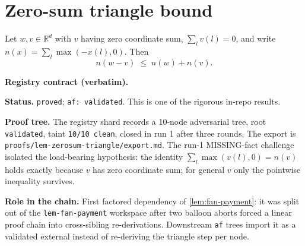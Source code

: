 \section{Zero-sum triangle bound}\label{sec:zerosum-triangle}

\begin{lemma}\label{lem:zerosum-triangle}
Let $w,v\in\mathbb{R}^d$ with $v$ having zero coordinate sum, $\sum_l v(l)=0$,
and write $n(x)=\sum_l\max(-x(l),0)$. Then
\[
  n(w-v)\;\le\;n(w)+n(v).
\]
\end{lemma}

\noindent\textbf{Registry contract (verbatim).}

\noindent\textbf{Status.} \texttt{proved}; \texttt{af: validated}.
This is one of the rigorous in-repo results.

\noindent\textbf{Proof tree.} The registry shard records a 10-node
adversarial tree, root \texttt{validated}, taint \texttt{10/10 clean},
closed in run 1 after three rounds.  The export is
\texttt{proofs/lem-zerosum-triangle/export.md}.  The run-1 MISSING-fact
challenge isolated the load-bearing hypothesis: the identity
$\sum_l \max(v(l),0) = n(v)$ holds exactly because $v$ has zero
coordinate sum; for general $v$ only the pointwise inequality survives.

\noindent\textbf{Role in the chain.} First factored dependency of
\ref{lem:fan-payment}: it was split out of the
\texttt{lem-fan-payment} workspace after two balloon aborts forced a
linear proof chain into cross-sibling re-derivations.  Downstream
\texttt{af} trees import it as a validated external instead of
re-deriving the triangle step per node.
